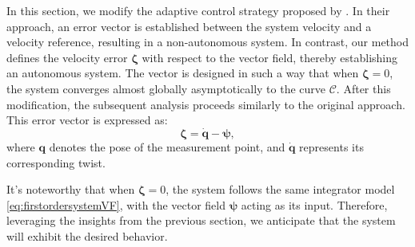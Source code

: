 In this section, we modify the adaptive control strategy proposed by \cite{Culbertson2021}. In their approach, an error vector is established between the system velocity and a velocity reference, resulting in a non-autonomous system. In contrast, our method defines the velocity error $\boldsymbol{\zeta}$ with respect to the vector field, thereby establishing an autonomous system. The vector is designed in such a way that when $\boldsymbol{\zeta}=0$, the system converges almost globally asymptotically to the curve $\mathcal{C}$. After this modification, the subsequent analysis proceeds similarly to the original approach. This error vector is expressed as:
\begin{equation}
    \boldsymbol{\zeta} = \dot{\mathbf{q}} - \boldsymbol{\psi},\label{eq:errorvector-s}
\end{equation}
where $\mathbf{q}$ denotes the pose of the measurement point, and $\dot{\mathbf{q}}$ represents its corresponding twist.

It's noteworthy that when $\boldsymbol{\zeta}=0$, the system follows the same integrator model \eqref{eq:firstordersystemVF}, with the vector field $\boldsymbol{\psi}$ acting as its input. Therefore, leveraging the insights from the previous section, we anticipate that the system will exhibit the desired behavior.

